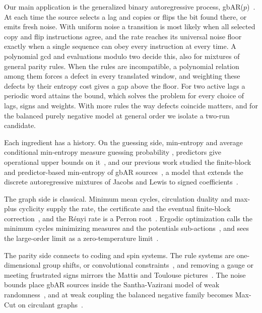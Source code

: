 \documentclass[11pt,a4paper]{article}
\begin{document}
Our main application is the generalized binary autoregressive process,
gbAR($p$)~\cite{jentsch2019generalized}.  At each time the source
selects a lag and copies or flips the bit found there, or emits fresh
noise.  With uniform noise a transition is most likely when all
selected copy and flip instructions agree, and the rate reaches its
universal noise floor exactly when a single sequence can obey every
instruction at every time.  A polynomial gcd and evaluations modulo
two decide this, also for mixtures of general parity rules.  When the
rules are incompatible, a polynomial relation among them forces a
defect in every translated window, and weighting these defects by their
entropy cost gives a gap above the floor.  For two active lags a
periodic word attains the bound, which solves the problem for every
choice of lags, signs and weights.  With more rules the way defects
coincide matters, and for the balanced purely negative model at
general order we isolate a two-run candidate.

Each ingredient has a history.  On the guessing side, min-entropy and
average conditional min-entropy measure guessing probability
\cite{renyi1961measures,dodis2004fuzzy}, predictors give operational
upper bounds on it~\cite{kelsey2015predictive}, and our previous work
studied the finite-block and predictor-based min-entropy of gbAR
sources~\cite{blanco2025machine}, a model that extends the discrete
autoregressive mixtures of Jacobs and Lewis to signed
coefficients~\cite{jacobs1978discrete,jentsch2019generalized}.

The graph side is classical.  Minimum mean cycles, circulation duality
and max-plus cyclicity supply the rate, the certificate and the eventual
finite-block correction~\cite{karp1978characterization,baccelli1992synchronization},
and the R\'enyi rate is a Perron root~\cite{rached2001renyi}.  Ergodic
optimization calls the minimum cycles minimizing measures and the
potentials sub-actions~\cite{jenkinson2006ergodic,jenkinson2019ergodic,bousch2000lepoisson,garibaldi2017ergodic},
and sees the large-order limit as a zero-temperature
limit~\cite{bremont2003gibbs,chazottes2011zero}.

The parity side connects to coding and spin systems.  The rule systems
are one-dimensional group shifts, or convolutional
constraints~\cite{schmidt1995dynamical,forney1970convolutional}, and
removing a gauge or meeting frustrated signs mirrors the Mattis and
Toulouse pictures~\cite{mattis1976solvable,toulouse1977frustration}.
The noise bounds place gbAR sources inside the Santha-Vazirani model of
weak randomness~\cite{santha1986generating,chor1988unbiased}, and at
weak coupling the balanced negative family becomes Max-Cut on circulant
graphs~\cite{poljak1992max}.
\end{document}
